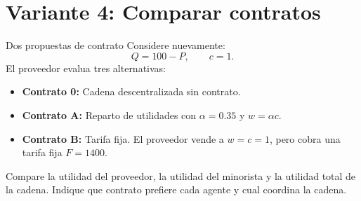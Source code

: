 \section{Variante 4: Comparar contratos}

\begin{enunciado}{Dos propuestas de contrato}
Considere nuevamente:
\[
Q=100-P,
\qquad
c=1.
\]
El proveedor evalua tres alternativas:

\begin{itemize}
    \item \textbf{Contrato 0:} Cadena descentralizada sin contrato.
    \item \textbf{Contrato A:} Reparto de utilidades con \(\alpha=0.35\) y \(w=\alpha c\).
    \item \textbf{Contrato B:} Tarifa fija. El proveedor vende a \(w=c=1\), pero cobra una tarifa fija \(F=1400\).
\end{itemize}

Compare la utilidad del proveedor, la utilidad del minorista y la utilidad total de la cadena. Indique que contrato prefiere cada agente y cual coordina la cadena.
\end{enunciado}
